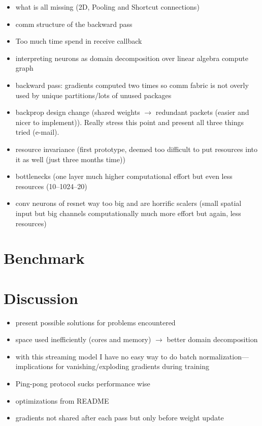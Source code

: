 \documentclass[]{article}
\begin{document}
\begin{itemize}
  \item what is all missing (2D, Pooling and Shortcut connections)
  \item comm structure of the backward pass
  \item Too much time spend in receive callback
  \item interpreting neurons as domain decomposition over linear algebra
    compute graph
  \item backward pass: gradients computed two times so comm fabric is
    not overly used by unique partitions/lots of unused packages
  \item backprop design change (shared weights $\rightarrow$ redundant
    packets (easier and nicer to implement)).
    Really stress this point and present all three things tried
    (e-mail).
  \item resource invariance (first prototype, deemed too difficult
    to put resources into it as well (just three months time))
  \item bottlenecks (one layer much higher
    computational effort but even less resources (10--1024--20)
  \item conv neurons of resnet way too big and are horrific scalers
    (small spatial input but big channels computationally much more
    effort but again, less resources)
\end{itemize}




\section{Benchmark}
\label{sec:benchmark}

\section{Discussion}
\label{sec:discussion}

\begin{itemize}
  \item present possible solutions for problems encountered
  \item space used inefficiently (cores and memory) $\rightarrow$ better
    domain decomposition
  \item with this streaming model I have no easy way to do batch
    normalization---implications for vanishing/exploding gradients
    during training
  \item Ping-pong protocol sucks performance wise
  \item optimizations from README
  \item gradients not shared after each pass but only before weight
    update
\end{itemize}
\end{document}
